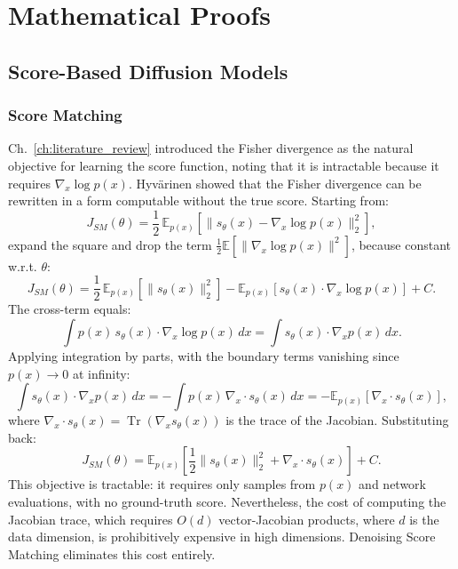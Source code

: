 \chapter{Mathematical Proofs}
\label{app:score_diff_models}

\section{Score-Based Diffusion Models}
\subsection{Score Matching}
\label{app:subsec:sm}

Ch.\ \ref{ch:literature_review}  introduced the Fisher divergence as the natural objective for
learning the score function, noting that it is intractable because it requires
$\nabla_x \log p(x)$. Hyv\"arinen \cite{hyvarinen2005estimation} showed that
the Fisher divergence can be rewritten in a form computable without the true
score. Starting from:
\[
    J_{SM}(\theta) = \frac{1}{2}\,
    \mathbb{E}_{p(x)}\!\left[\|s_\theta(x) - \nabla_x \log p(x)\|_2^2\right],
\]
expand the square and drop the term $\frac{1}{2}\mathbb{E}[\|\nabla_x \log
p(x)\|^2]$, because constant w.r.t. $\theta$:
\[
    J_{SM}(\theta) = \frac{1}{2}\,\mathbb{E}_{p(x)}\!\left[\|s_\theta(x)\|_2^2\right]
    - \mathbb{E}_{p(x)}\!\left[s_\theta(x) \cdot \nabla_x \log p(x)\right] + C.
\]
The cross-term equals:
\[
    \int p(x)\, s_\theta(x) \cdot \nabla_x \log p(x)\,dx
    = \int s_\theta(x) \cdot \nabla_x p(x)\,dx.
\]
Applying integration by parts, with the boundary terms vanishing since $p(x)\to 0$ at
infinity:
\[
    \int s_\theta(x) \cdot \nabla_x p(x)\,dx
    = -\int p(x)\,\nabla_x \cdot s_\theta(x)\,dx
    = -\mathbb{E}_{p(x)}\!\left[\nabla_x \cdot s_\theta(x)\right],
\]
where $\nabla_x \cdot s_\theta(x) = \operatorname{Tr}(\nabla_x s_\theta(x))$
is the trace of the Jacobian. Substituting back:
\begin{equation}
    \label{eq:sm_tractable}
    J_{SM}(\theta) = \mathbb{E}_{p(x)}\!\left[
    \frac{1}{2}\|s_\theta(x)\|_2^2 + \nabla_x \cdot s_\theta(x)
    \right] + C.
\end{equation}
This objective is tractable: it requires only samples from $p(x)$ and network
evaluations, with no ground-truth score. Nevertheless, the cost of computing the Jacobian
trace, which requires $O(d)$ vector-Jacobian products, where $d$ is the data dimension, is prohibitively expensive in high dimensions. Denoising Score Matching
eliminates this cost entirely.

